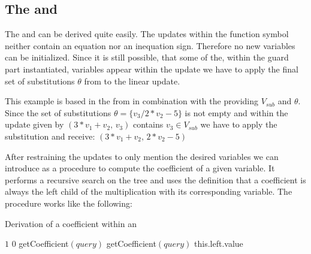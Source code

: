 \subsection{The \updatematrix and \updateconstants}
\label{sec:derivation-update}
The \updatematrix and \updateconstants can be derived quite easily. The updates within the function symbol neither contain an equation nor an inequation sign. Therefore no new variables can be initialized. Since it is still possible, that some of the, within the guard part instantiated, variables appear within the update we have to apply the final set of substitutions $\theta$ from  to the linear update. 

\begin{example}
	\label{ex:derivation-update-sub}
	This example is based in the \its  from  in combination with the  providing $V_{sub}$ and $\theta$. \newline
	Since the set of substitutions $\theta=\{v_3/2*v_2-5\}$ is not empty and within the update given by\newline
	\hspace*{1cm}$(3*v_1+v_2\text{, } v_3)$\newline
	contains $v_3 \in V_{sub}$ we have to apply the substitution and receive:\newline
	\hspace*{1cm}$(3*v_1+v_2\text{, }2*v_2-5)$
\end{example}

After restraining the updates to only mention the desired variables we can introduce  as a procedure to compute the coefficient of a given variable. It performs a recursive search on the tree and uses the \stdLinInt definition that a coefficient is always the left child of the multiplication with its corresponding variable. The procedure works like the following:
\begin{algorithm}[H]
	\caption{Derivation of a coefficient within an \rpntree}
	\label{algo:coefficient}
	\begin{algorithmic}[1]
				\State \Return $1$
			 
				\State \Return $0$
			\EndIf
			\State
			 
					\State \Return getCoefficient$(query)$
				\Else
					\State \Return getCoefficient$(query)$
				\EndIf
			\EndIf
			 
					\State \Return this.left.value
				\EndIf				
			\EndIf
		\EndFunction
	\end{algorithmic}
\end{algorithm}

